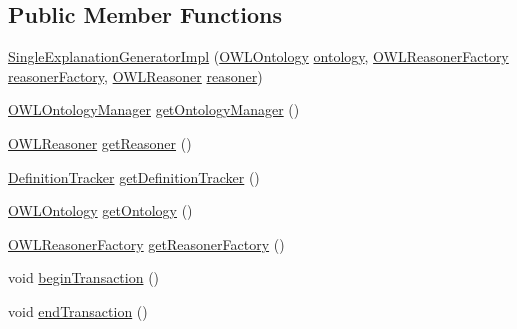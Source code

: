 \subsection*{Public Member Functions}
\begin{DoxyCompactItemize}
\item 
\hyperlink{classcom_1_1clarkparsia_1_1owlapi_1_1explanation_1_1_single_explanation_generator_impl_acc38804267856bf1c400584d9c7aa93a}{Single\-Explanation\-Generator\-Impl} (\hyperlink{interfaceorg_1_1semanticweb_1_1owlapi_1_1model_1_1_o_w_l_ontology}{O\-W\-L\-Ontology} \hyperlink{classcom_1_1clarkparsia_1_1owlapi_1_1explanation_1_1_single_explanation_generator_impl_ac4bb20805a66ec91e52ae4dc7d3dd6d4}{ontology}, \hyperlink{interfaceorg_1_1semanticweb_1_1owlapi_1_1reasoner_1_1_o_w_l_reasoner_factory}{O\-W\-L\-Reasoner\-Factory} \hyperlink{classcom_1_1clarkparsia_1_1owlapi_1_1explanation_1_1_single_explanation_generator_impl_a2eacc90779bb1e8895675560a1d3b57a}{reasoner\-Factory}, \hyperlink{interfaceorg_1_1semanticweb_1_1owlapi_1_1reasoner_1_1_o_w_l_reasoner}{O\-W\-L\-Reasoner} \hyperlink{classcom_1_1clarkparsia_1_1owlapi_1_1explanation_1_1_single_explanation_generator_impl_a9df949455124847c9685dc24a31f225b}{reasoner})
\item 
\hyperlink{interfaceorg_1_1semanticweb_1_1owlapi_1_1model_1_1_o_w_l_ontology_manager}{O\-W\-L\-Ontology\-Manager} \hyperlink{classcom_1_1clarkparsia_1_1owlapi_1_1explanation_1_1_single_explanation_generator_impl_a714b5e72b29a583f180fc5ab4b94e1a5}{get\-Ontology\-Manager} ()
\item 
\hyperlink{interfaceorg_1_1semanticweb_1_1owlapi_1_1reasoner_1_1_o_w_l_reasoner}{O\-W\-L\-Reasoner} \hyperlink{classcom_1_1clarkparsia_1_1owlapi_1_1explanation_1_1_single_explanation_generator_impl_aacc5dbe06c4ddbd58aeeaa723c305761}{get\-Reasoner} ()
\item 
\hyperlink{classcom_1_1clarkparsia_1_1owlapi_1_1explanation_1_1util_1_1_definition_tracker}{Definition\-Tracker} \hyperlink{classcom_1_1clarkparsia_1_1owlapi_1_1explanation_1_1_single_explanation_generator_impl_a846a5cd1400802d2b22c60e87dd5715b}{get\-Definition\-Tracker} ()
\item 
\hyperlink{interfaceorg_1_1semanticweb_1_1owlapi_1_1model_1_1_o_w_l_ontology}{O\-W\-L\-Ontology} \hyperlink{classcom_1_1clarkparsia_1_1owlapi_1_1explanation_1_1_single_explanation_generator_impl_a86505a0b5175a58c353bed9f4f742bd6}{get\-Ontology} ()
\item 
\hyperlink{interfaceorg_1_1semanticweb_1_1owlapi_1_1reasoner_1_1_o_w_l_reasoner_factory}{O\-W\-L\-Reasoner\-Factory} \hyperlink{classcom_1_1clarkparsia_1_1owlapi_1_1explanation_1_1_single_explanation_generator_impl_a641cb92e1445533f6b4acaf231efa8c3}{get\-Reasoner\-Factory} ()
\item 
void \hyperlink{classcom_1_1clarkparsia_1_1owlapi_1_1explanation_1_1_single_explanation_generator_impl_a433db251d75f43af675ca4b6eb7b488e}{begin\-Transaction} ()
\item 
void \hyperlink{classcom_1_1clarkparsia_1_1owlapi_1_1explanation_1_1_single_explanation_generator_impl_a710ad794ef4c66a5d39999379e04a2ef}{end\-Transaction} ()
\end{DoxyCompactItemize}
